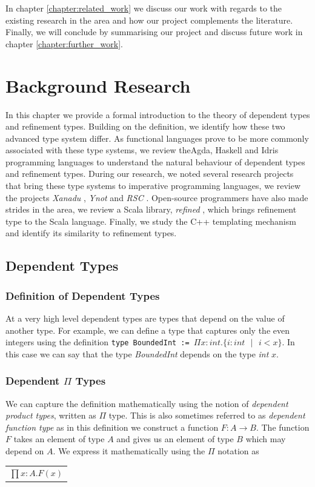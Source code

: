 \documentclass[a4paper,12pt]{report}
\begin{document}
\par
In chapter \ref{chapter:related_work} we discuss our work with regards to the 
existing research in the area and how our project complements the literature.
Finally, we will conclude by summarising our project and discuss future work in 
chapter \ref{chapter:further_work}. 

\chapter{Background Research} \label{chapter:background}
In this chapter we provide a formal introduction to the theory of dependent 
types and refinement types. Building on the definition, we identify how these two 
advanced type system differ. As functional languages prove to be more 
commonly associated with these type systems, we review theAgda, Haskell and Idris 
programming languages to understand the natural behaviour of dependent types 
and refinement types. During our research, we noted several research projects  
that bring these type systems to imperative programming languages, we review 
the projects \textit{Xanadu} \cite{xanadu}, \textit{Ynot} \cite{ynot} and 
\textit{RSC} \cite{rts}. Open-source programmers have also made strides in 
the area, we review a Scala library, \textit{refined} \cite{refinedScala}, 
which brings refinement type to the Scala language. Finally, we study the C++ 
templating mechanism and identify its similarity to refinement types. 

\section{Dependent Types}
\subsection{Definition of Dependent Types}
At a very high level dependent types are types that depend on the value of 
another type. For example, we can define a type that captures only the even 
integers using the definition 
\verb|type BoundedInt := |$\Pi x : int.\{i : int\text{ }|\text{ } i < x\}$. 
In this case we can say that the type \textit{BoundedInt} depends on the 
type \textit{int} $x$.

\subsection{Dependent $\Pi$ Types}
We can capture the definition mathematically using the notion of \textit{dependent 
product types}, written as $\Pi$ type. This is also sometimes referred to as 
\textit{dependent function type} as in this definition we construct a function 
$F: A \rightarrow B$. The function $F$ takes an element of type $A$ and 
gives us an element of type $B$ which may depend on $A$. We express it 
mathematically using the $\Pi$ notation as
\begin{center}
 \begin{tabular}{l}
   $\prod x: A.  F(x)$
 \end{tabular} 
\end{center}
\end{document}
